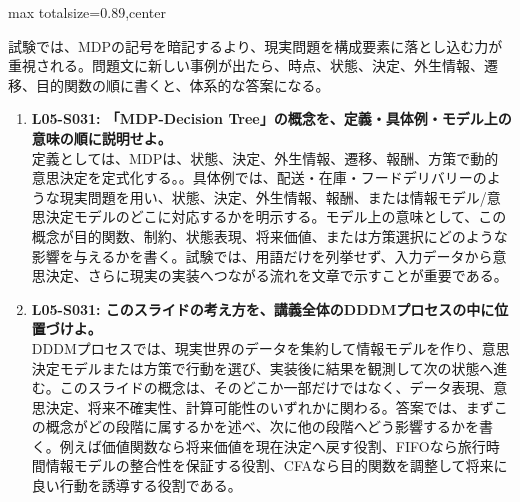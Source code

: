 \begin{minipage}[t]{0.58\textwidth}
\begin{adjustbox}{max totalsize={\textwidth}{0.89\textheight},center}
\begin{minipage}{\textwidth}
試験では、MDPの記号を暗記するより、現実問題を構成要素に落とし込む力が重視される。問題文に新しい事例が出たら、時点、状態、決定、外生情報、遷移、目的関数の順に書くと、体系的な答案になる。\par{}\begin{enumerate}\item \textbf{L05-S031: 「MDP-Decision Tree」の概念を、定義・具体例・モデル上の意味の順に説明せよ。}\\定義としては、MDPは、状態、決定、外生情報、遷移、報酬、方策で動的意思決定を定式化する。。具体例では、配送・在庫・フードデリバリーのような現実問題を用い、状態、決定、外生情報、報酬、または情報モデル/意思決定モデルのどこに対応するかを明示する。モデル上の意味として、この概念が目的関数、制約、状態表現、将来価値、または方策選択にどのような影響を与えるかを書く。試験では、用語だけを列挙せず、入力データから意思決定、さらに現実の実装へつながる流れを文章で示すことが重要である。\item \textbf{L05-S031: このスライドの考え方を、講義全体のDDDMプロセスの中に位置づけよ。}\\DDDMプロセスでは、現実世界のデータを集約して情報モデルを作り、意思決定モデルまたは方策で行動を選び、実装後に結果を観測して次の状態へ進む。このスライドの概念は、そのどこか一部だけではなく、データ表現、意思決定、将来不確実性、計算可能性のいずれかに関わる。答案では、まずこの概念がどの段階に属するかを述べ、次に他の段階へどう影響するかを書く。例えば価値関数なら将来価値を現在決定へ戻す役割、FIFOなら旅行時間情報モデルの整合性を保証する役割、CFAなら目的関数を調整して将来に良い行動を誘導する役割である。\end{enumerate}
\end{minipage}
\end{adjustbox}
\end{minipage}



